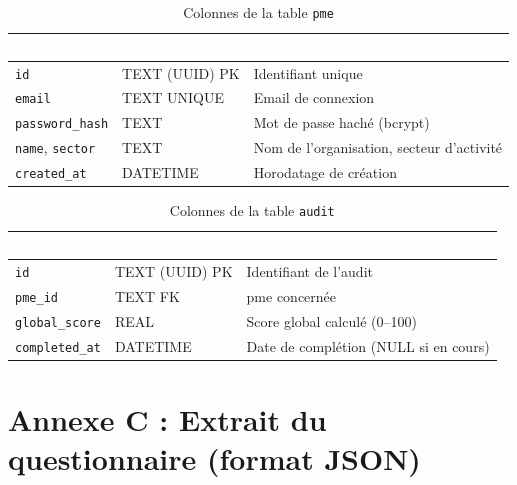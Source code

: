 \documentclass[12pt, a4paper, oneside]{report}
\begin{document}
\renewcommand{\thetable}{B.1}
\begin{table}[H]
  \centering
  \caption{Colonnes de la table \texttt{pme}}
  \label{tab:annexe_schema}
  \renewcommand{\arraystretch}{1.3}
  \small
  \begin{tabularx}{\textwidth}{|l|l|X|}
    \hline
    \rowcolor{iacsTableHead}
    \textcolor{white}{\textbf{Colonne}} &
    \textcolor{white}{\textbf{Type}} &
    \textcolor{white}{\textbf{Description}} \\
    \hline
    \texttt{id} & TEXT (UUID) PK & Identifiant unique \\
    \hline
    \rowcolor{iacsLightGray}
    \texttt{email} & TEXT UNIQUE & Email de connexion \\
    \hline
    \texttt{password\_hash} & TEXT & Mot de passe haché (bcrypt) \\
    \hline
    \rowcolor{iacsLightGray}
    \texttt{name}, \texttt{sector} & TEXT & Nom de l'organisation, secteur d'activité \\
    \hline
    \texttt{created\_at} & DATETIME & Horodatage de création \\
    \hline
  \end{tabularx}
\end{table}

\renewcommand{\thetable}{B.2}
\begin{table}[H]
  \centering
  \caption{Colonnes de la table \texttt{audit}}
  \renewcommand{\arraystretch}{1.3}
  \small
  \begin{tabularx}{\textwidth}{|l|l|X|}
    \hline
    \rowcolor{iacsTableHead}
    \textcolor{white}{\textbf{Colonne}} &
    \textcolor{white}{\textbf{Type}} &
    \textcolor{white}{\textbf{Description}} \\
    \hline
    \texttt{id} & TEXT (UUID) PK & Identifiant de l'audit \\
    \hline
    \rowcolor{iacsLightGray}
    \texttt{pme\_id} & TEXT FK & \gls{pme} concernée \\
    \hline
    \texttt{global\_score} & REAL & Score global calculé (0--100) \\
    \hline
    \rowcolor{iacsLightGray}
    \texttt{completed\_at} & DATETIME & Date de complétion (NULL si en cours) \\
    \hline
  \end{tabularx}
\end{table}

\section*{Annexe C : Extrait du questionnaire (format JSON)}
\end{document}
